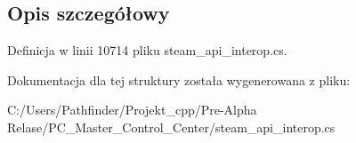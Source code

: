 \subsection{Opis szczegółowy}


Definicja w linii 10714 pliku steam\+\_\+api\+\_\+interop.\+cs.



Dokumentacja dla tej struktury została wygenerowana z pliku\+:\begin{DoxyCompactItemize}
\item 
C\+:/\+Users/\+Pathfinder/\+Projekt\+\_\+cpp/\+Pre-\/\+Alpha Relase/\+P\+C\+\_\+\+Master\+\_\+\+Control\+\_\+\+Center/steam\+\_\+api\+\_\+interop.\+cs\end{DoxyCompactItemize}
